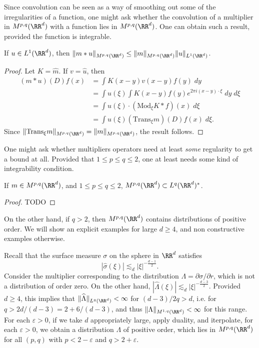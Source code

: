 Since convolution can be seen as a way of smoothing out some of the irregularities of a function, one might ask whether the convolution of a multiplier in $M^{p,q}(\RR^d)$ with a function lies in $M^{p,q}(\RR^d)$. One can obtain such a result, provided the function is integrable.

\begin{theorem}
    If $u \in L^1(\RR^d)$, then $\| m * u \|_{M^{p,q}(\RR^d)} \leq \| m \|_{M^{p,q}(\RR^d)} \| u \|_{L^1(\RR^d)}$.
\end{theorem}
\begin{proof}
    Let $K = \widehat{m}$. If $v = \widehat{u}$, then
    \begin{align*}
        (m * u)(D) f(x) &= \int K(x-y) v(x-y) f(y)\; dy\\
        &= \int u(\xi) \int K(x-y) f(y) e^{2 \pi i (x - y) \cdot \xi}\; dy\; d\xi\\
        &= \int u(\xi) \cdot (\text{Mod}_\xi K * f)(x)\; d\xi\\
        &= \int u(\xi) (\text{Trans}_\xi m)(D) f(x)\; d\xi.
    \end{align*}
    Since $\| \text{Trans}_\xi m \|_{M^{p,q}(\RR^d)} = \| m \|_{M^{p,q}(\RR^d)}$, the result follows.
\end{proof}

One might ask whether multipliers operators need at least \emph{some} regularity to get a bound at all. Provided that $1 \leq p \leq q \leq 2$, one at least needs some kind of integrability condition.

\begin{theorem}
    If $m \in M^{p,q}(\RR^d)$, and $1 \leq p \leq q \leq 2$, $M^{p,q}(\RR^d) \subset L^q(\RR^d)^*$.
\end{theorem}
\begin{proof}
    TODO
\end{proof}

On the other hand, if $q > 2$, then $M^{p,q}(\RR^d)$ contains distributions of positive order. We will show an explicit examples for large $d \geq 4$, and non constructive examples otherwise.

\begin{example}
    Recall that the surface measure $\sigma$ on the sphere in $\RR^d$ satisfies
    \[ |\widehat{\sigma}(\xi)| \lesssim_d |\xi|^{- \frac{d-1}{2}}. \]
    Consider the multiplier corresponding to the distribution $\Lambda = \partial \sigma / \partial r$, which is not a distribution of order zero. On the other hand, $|\widehat{\Lambda}(\xi)| \lesssim_d |\xi|^{-\frac{d-3}{2}}$. Provided $d \geq 4$, this implies that $\| \widehat{\Lambda} \|_{L^q(\RR^d)} < \infty$ for $(d-3)/2 q > d$, i.e. for $q > 2d/(d-3) = 2 + 6/(d-3)$, and thus $\| \Lambda \|_{M^{1,q}(\RR^d)} < \infty$ for this range. For each $\varepsilon > 0$, if we take $d$ appropriately large, apply duality, and iterpolate, for each $\varepsilon > 0$, we obtain a distribution $\Lambda$ of positive order, which lies in $M^{p,q}(\RR^d)$ for all $(p,q)$ with $p < 2 - \varepsilon$ and $q > 2 + \varepsilon$.
\end{example}


